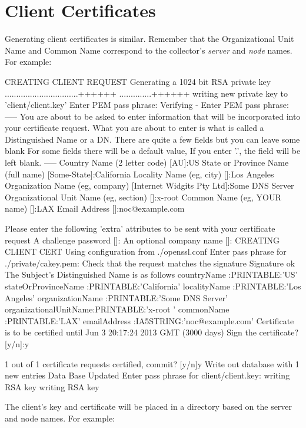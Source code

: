 \documentclass{report}
\begin{document}
\section{Client Certificates}

Generating client certificates is similar.  Remember that
the Organizational Unit Name and Common Name correspond to the
collector's {\em server\/} and {\em node\/} names.   For example:

\begin{MyVerbatim}
CREATING CLIENT REQUEST
Generating a 1024 bit RSA private key
................................++++++
..............++++++
writing new private key to 'client/client.key'
Enter PEM pass phrase:
Verifying - Enter PEM pass phrase:
-----
You are about to be asked to enter information that will be incorporated
into your certificate request.
What you are about to enter is what is called a Distinguished Name or a DN.
There are quite a few fields but you can leave some blank
For some fields there will be a default value,
If you enter '.', the field will be left blank.
-----
Country Name (2 letter code) [AU]:US
State or Province Name (full name) [Some-State]:California
Locality Name (eg, city) []:Los Angeles
Organization Name (eg, company) [Internet Widgits Pty Ltd]:Some DNS Server
Organizational Unit Name (eg, section) []:x-root  
Common Name (eg, YOUR name) []:LAX
Email Address []:noc@example.com

Please enter the following 'extra' attributes
to be sent with your certificate request
A challenge password []:
An optional company name []:
CREATING CLIENT CERT
Using configuration from ./openssl.conf
Enter pass phrase for ./private/cakey.pem:
Check that the request matches the signature
Signature ok
The Subject's Distinguished Name is as follows
countryName           :PRINTABLE:'US'
stateOrProvinceName   :PRINTABLE:'California'
localityName          :PRINTABLE:'Los Angeles'
organizationName      :PRINTABLE:'Some DNS Server'
organizationalUnitName:PRINTABLE:'x-root  '
commonName            :PRINTABLE:'LAX'
emailAddress          :IA5STRING:'noc@example.com'
Certificate is to be certified until Jun  3 20:17:24 2013 GMT (3000 days)
Sign the certificate? [y/n]:y 


1 out of 1 certificate requests certified, commit? [y/n]y
Write out database with 1 new entries
Data Base Updated
Enter pass phrase for client/client.key:
writing RSA key
writing RSA key
\end{MyVerbatim}

The client's key and certificate will be placed in a directory
based on the server and node names.  For example:
\end{document}

